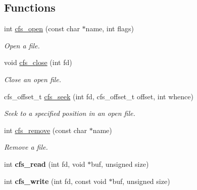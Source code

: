 \subsection*{Functions}
\begin{DoxyCompactItemize}
\item 
int \hyperlink{group__cfs_gadc1727a1a27a40a8483135425a42c5de}{cfs\+\_\+open} (const char $\ast$name, int flags)
\begin{DoxyCompactList}\small\item\em Open a file. \end{DoxyCompactList}\item 
void \hyperlink{group__cfs_gadc3991eb5ac0e1cb6fd5e162049785b4}{cfs\+\_\+close} (int fd)
\begin{DoxyCompactList}\small\item\em Close an open file. \end{DoxyCompactList}\item 
cfs\+\_\+offset\+\_\+t \hyperlink{group__cfs_ga116cdc7036a99707477b50bd496fa1c1}{cfs\+\_\+seek} (int fd, cfs\+\_\+offset\+\_\+t offset, int whence)
\begin{DoxyCompactList}\small\item\em Seek to a specified position in an open file. \end{DoxyCompactList}\item 
int \hyperlink{group__cfs_gacad1f14239db1a889ccf9804040e0d20}{cfs\+\_\+remove} (const char $\ast$name)
\begin{DoxyCompactList}\small\item\em Remove a file. \end{DoxyCompactList}\item 
\hypertarget{cfs-coffee_8c_a22629bff6e0188e67310f6348d3a17f8}{}int {\bfseries cfs\+\_\+read} (int fd, void $\ast$buf, unsigned size)\label{cfs-coffee_8c_a22629bff6e0188e67310f6348d3a17f8}

\item 
\hypertarget{cfs-coffee_8c_ab2c315c65456a6d5c73b8ed11a9d96ff}{}int {\bfseries cfs\+\_\+write} (int fd, const void $\ast$buf, unsigned size)\label{cfs-coffee_8c_ab2c315c65456a6d5c73b8ed11a9d96ff}


\end{DoxyCompactItemize}
